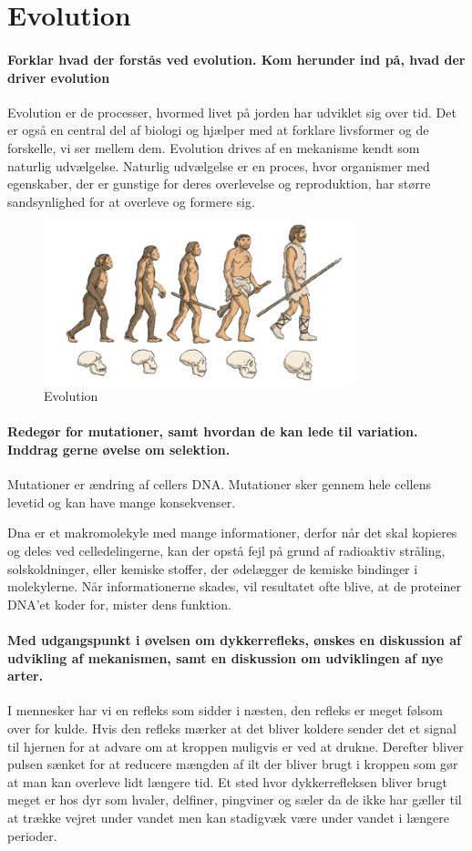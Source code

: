 \newpage
\part{Evolution}
\subsection*{Forklar hvad der forstås ved evolution. Kom herunder ind på, hvad der driver evolution}
Evolution er de processer, hvormed livet på jorden har udviklet sig over tid. Det er også en central del af biologi og hjælper med at forklare livsformer og de forskelle, vi ser mellem dem. Evolution drives af en mekanisme kendt som naturlig udvælgelse. Naturlig udvælgelse er en proces, hvor organismer med egenskaber, der er gunstige for deres overlevelse og reproduktion, har større sandsynlighed for at overleve og formere sig. 
\begin{figure}
    \centering
    \includegraphics[width=0.8\textwidth]{figurs/Picture3.png}
    \caption{Evolution}
    \label{fig:evolution}
\end{figure}
\subsection*{Redegør for mutationer, samt hvordan de kan lede til variation. Inddrag gerne øvelse om selektion.}
Mutationer er ændring af cellers DNA. Mutationer sker gennem hele cellens levetid og kan have mange konsekvenser. 

Dna er et makromolekyle med mange informationer, derfor når det skal kopieres og deles ved celledelingerne, kan der opstå fejl på grund af radioaktiv stråling, solskoldninger, eller kemiske stoffer, der ødelægger de kemiske bindinger i molekylerne. Når informationerne skades, vil resultatet ofte blive, at de proteiner DNA'et koder for, mister dens funktion. 
\subsection*{Med udgangspunkt i øvelsen om dykkerrefleks, ønskes en diskussion af udvikling af mekanismen, samt en diskussion om udviklingen af nye arter.}
I mennesker har vi en refleks som sidder i næsten, den refleks er meget følsom over for kulde. Hvis den refleks mærker at det bliver koldere sender det et signal til hjernen for at advare om at kroppen muligvis er ved at drukne. Derefter bliver pulsen sænket for at reducere mængden af ilt der bliver brugt i kroppen som gør at man kan overleve lidt længere tid. Et sted hvor dykkerrefleksen bliver brugt meget er hos dyr som hvaler, delfiner, pingviner og sæler da de ikke har gæller til at trække vejret under vandet men kan stadigvæk være under vandet i længere perioder. 